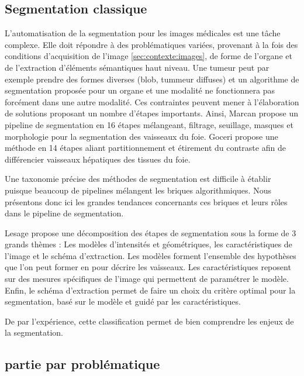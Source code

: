 \subsection{Segmentation classique}
\label{sec:EA:segmentation_historique}
% 
L'automatisation de la segmentation pour les images médicales est une tâche complexe. Elle doit répondre à des problématiques variées, provenant à la fois des conditions d'acquisition de l'image \ref{sec:contexte:images}, de forme de l'organe et de l'extraction d'éléments sémantiques haut niveau. Une tumeur peut par exemple prendre des formes diverses (blob, tummeur diffuses) et un algorithme de segmentation proposée pour un organe et une modalité ne fonctionnera pas forcément dans une autre modalité. Ces contraintes peuvent mener à l'élaboration de solutions proposant un nombre d'étapes importants. Ainsi, Marcan \cite{Marcan2014_vessel_seg} propose un pipeline de segmentation en 16 étapes mélangeant, filtrage, seuillage, masques et morphologie pour la segmentation des vaisseaux du foie. Goceri \cite{Goceri2017_vessel} propose une méthode en 14 étapes aliant partitionnement et étirement du contraste afin de différencier vaisseaux hépatiques des tissues du foie.

Une taxonomie précise des méthodes de segmentation est difficile à établir puisque beaucoup de pipelines mélangent les briques algorithmiques. Nous présentons donc ici les grandes tendances concernants ces briques et leurs rôles dans le pipeline de segmentation.

Lesage \cite{Lesage2009_review} propose une décomposition des étapes de segmentation sous la forme de 3 grands thèmes : Les modèles d'intensités et géométriques, les caractéristiques de l'image et le schéma d'extraction. Les modèles forment l'ensemble des hypothèses que l'on peut former en pour décrire les vaisseaux. Les caractéristiques reposent sur des mesures spécifiques de l'image qui permettent de paramétrer le modèle. Enfin, le schéma d'extraction permet de faire un choix du critère optimal pour la segmentation, basé sur le modèle et guidé par les caractéristiques.

De par l'expérience, cette classification permet de bien comprendre les enjeux de la segmentation.

\subsection{partie par problématique}
